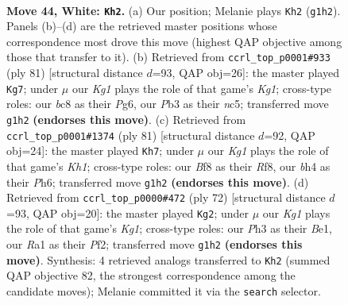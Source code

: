 \documentclass[11pt]{article}
\begin{document}
\clearpage

\begin{figure}[p]\centering
\begin{subfigure}{0.46\textwidth}\centering
\resizebox{\linewidth}{!}{%
\newchessgame
\chessboard[
  setfen={r1b2B1k/p1p2pp1/1p3n2/1q5p/5P1b/1P2Q2P/P1B3P1/R5K1 w - - 0 44},
  showmover=false,
  pgfstyle=straightmove, color=movearrow, markmove={g1-h2}
]}
\caption{}
\end{subfigure}\hfill
\begin{subfigure}{0.46\textwidth}\centering
\resizebox{\linewidth}{!}{%
\newchessgame
\chessboard[
  setfen={2r3k1/2q2p2/p5p1/pbNp4/1n1P2Pp/4PB1P/3Q1P2/R5K1 b - - 1 41},
  showmover=false,
  pgfstyle=straightmove, color=movearrow, markmove={g8-g7}
]}
\caption{}
\end{subfigure}
\\[4pt]
\begin{subfigure}{0.46\textwidth}\centering
\resizebox{\linewidth}{!}{%
\newchessgame
\chessboard[
  setfen={5r1k/2p1q1p1/2b4p/pp6/4p2P/PQP1P1PB/3R1PK1/8 b - - 0 41},
  showmover=false,
  pgfstyle=straightmove, color=movearrow, markmove={h8-h7}
]}
\caption{}
\end{subfigure}\hfill
\begin{subfigure}{0.46\textwidth}\centering
\resizebox{\linewidth}{!}{%
\newchessgame
\chessboard[
  setfen={8/p2q1pk1/1pn2bp1/2p4p/P7/1P2P1PP/2B1QP2/4B1K1 w - - 0 37},
  showmover=false,
  pgfstyle=straightmove, color=movearrow, markmove={g1-g2}
]}
\caption{}
\end{subfigure}
\caption{\textbf{Move 44, White: \texttt{Kh2}.} (a) Our position; Melanie plays \texttt{Kh2} (\texttt{g1h2}). Panels (b)--(d) are the retrieved master positions whose correspondence most drove this move (highest QAP objective among those that transfer to it). (b) Retrieved from \texttt{ccrl\_top\_p0001\#933} (ply 81) [structural distance $d$=93, QAP obj=26]: the master played \texttt{Kg7}; under $\mu$ our \emph{Kg1} plays the role of that game's \emph{Kg1}; cross-type roles: our \emph{b}c8 as their \emph{P}g6, our \emph{P}b3 as their \emph{n}c5; transferred move \texttt{g1h2} \textbf{(endorses this move)}. (c) Retrieved from \texttt{ccrl\_top\_p0001\#1374} (ply 81) [structural distance $d$=92, QAP obj=24]: the master played \texttt{Kh7}; under $\mu$ our \emph{Kg1} plays the role of that game's \emph{Kh1}; cross-type roles: our \emph{B}f8 as their \emph{R}f8, our \emph{b}h4 as their \emph{P}h6; transferred move \texttt{g1h2} \textbf{(endorses this move)}. (d) Retrieved from \texttt{ccrl\_top\_p0000\#472} (ply 72) [structural distance $d$=93, QAP obj=20]: the master played \texttt{Kg2}; under $\mu$ our \emph{Kg1} plays the role of that game's \emph{Kg1}; cross-type roles: our \emph{P}h3 as their \emph{B}e1, our \emph{R}a1 as their \emph{P}f2; transferred move \texttt{g1h2} \textbf{(endorses this move)}. Synthesis: 4 retrieved analogs transferred to \texttt{Kh2} (summed QAP objective 82, the strongest correspondence among the candidate moves); Melanie committed it via the \texttt{search} selector.}
\label{fig:thought-m86}
\end{figure}
\end{document}
